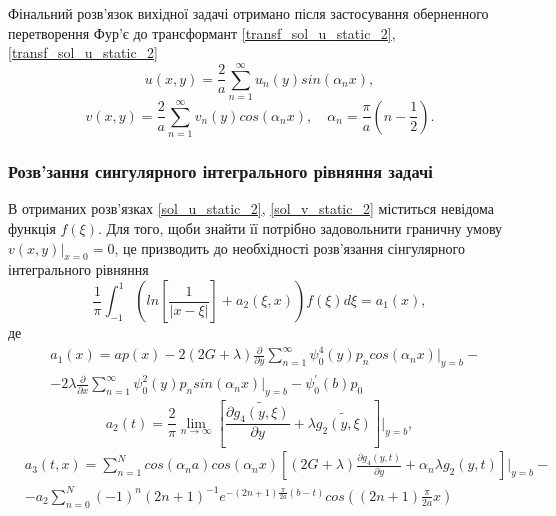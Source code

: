 Фінальний розв'язок вихідної задачі отримано після застосування оберненного перетворення Фур'є до трансформант \eqref{transf_sol_u_static_2}, \eqref{transf_sol_u_static_2}
\begin{equation}\label{sol_u_static_2}
    u(x,y) = \frac{2}{a} \sum_{n=1}^{\infty} u_n(y) sin(\alpha_n x),
\end{equation}
\begin{equation}\label{sol_v_static_2}
    v(x,y) = \frac{2}{a} \sum_{n=1}^{\infty} v_n(y) cos(\alpha_n x), \quad \alpha_n = \frac{\pi}{a}(n - \frac{1}{2}).
\end{equation}

\subsubsection{Розв'зання сингулярного інтегрального рівняння задачі}
В отриманих розв'язках \eqref{sol_u_static_2}, \eqref{sol_v_static_2} міститься невідома функція $f(\xi)$.
Для того, щоби знайти її потрібно задовольнити граничну умову $v(x, y) |_{x=0} = 0$,
це призводить до необхідності розв'язання сінгулярного інтегрального рівняння
\begin{equation}\label{int_eq_static_2}
    \frac{1}{\pi} \int_{-1}^{1} \left( ln\left[ \frac{1}{\lvert x - \xi \rvert} \right] + a_2(\xi, x) \right) f(\xi) d\xi = a_1(x),
\end{equation}
де
\begin{align*}
    &a_1(x) = a p(x) - 2(2G + \lambda) \frac{\partial}{\partial y} \sum_{n=1}^{\infty} \psi_0^{4}(y) p_n cos(\alpha_n x)|_{y=b} - \nonumber \\
    &- 2\lambda \frac{\partial}{\partial x} \sum_{n=1}^{\infty}\psi_0^2(y) p_n sin(\alpha_n x)|_{y=b} - \psi_0^{'}(b) p_0
\end{align*}
\begin{equation*}
    a_2(t) = \frac{2}{\pi} \lim_{n \rightarrow \infty}\left[ \frac{\partial \widetilde{g_4(y, \xi)}}{\partial y} + \lambda \widetilde{g_2(y, \xi)} \right]|_{y=b}, 
\end{equation*}
\begin{align*}
    &a_3(t, x) = \sum_{n=1}^{N} cos(\alpha_n a) cos(\alpha_n x) \left[(2G + \lambda) \frac{\partial g_4(y, t)}{\partial y} + \alpha_n \lambda g_2(y, t) \right]|_{y=b} - \\
    & - a_2 \sum_{n=0}^{N} (-1)^n (2n + 1)^{-1} e^{-(2n + 1) \frac{\pi}{2a} (b - t)} cos((2n + 1) \frac{\pi}{2a} x)
\end{align*}


